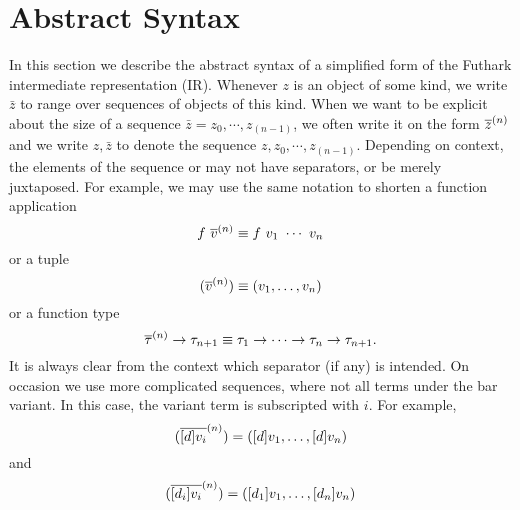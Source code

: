 \section{Abstract Syntax}

In this section we describe the abstract syntax of a simplified form
of the Futhark intermediate representation (IR).  Whenever $z$ is an
object of some kind, we write $\bar{z}$ to range over sequences of
objects of this kind. When we want to be explicit about the size of a
sequence $\bar{z} = z_0,\cdots,z_{(n-1)}$, we often write it on the
form $\overline{z}^{(n)}$ and we write $z,\bar{z}$ to denote the sequence
$z,z_0,\cdots,z_{(n-1)}$.  Depending on context, the elements of the
sequence or may not have separators, or be merely juxtaposed.  For
example, we may use the same notation to shorten a function
application
\[
  f~\overline{v}^{(n)} \equiv f~v_{1}~\cdots~v_{n}
\]
or a tuple
\[
  (\overline{v}^{(n)}) \equiv (v_{1}, \ldots, v_{n})
\]
or a function type
\[
  \overline{\tau}^{(n)} \rightarrow \tau_{n+1} \equiv \tau_{1} \rightarrow \cdots \rightarrow \tau_{n} \rightarrow \tau_{n+1}.
\]
It is always clear from the context which separator (if any) is
intended.  On occasion we use more complicated sequences, where not
all terms under the bar variant.  In this case, the variant term is
subscripted with $i$.  For example,
\[
  (\overline{[d]v_{i}}^{(n)}) = ([d]v_{1}, \ldots, [d] v_{n})
\]
and
\[
  (\overline{[d_{i}]v_{i}}^{(n)}) = ([d_{1}]v_{1}, \ldots, [d_{n}] v_{n})
\]

